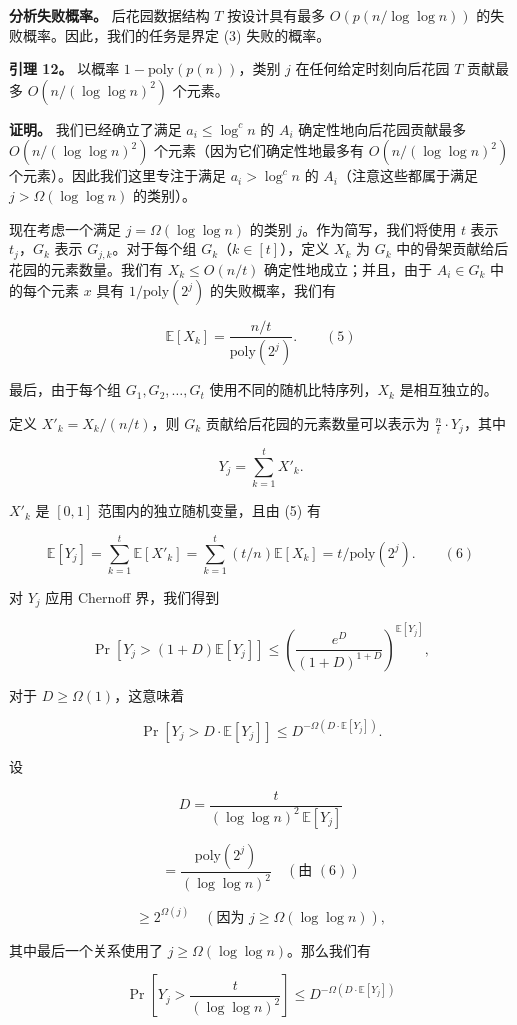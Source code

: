\documentclass[12pt,a4paper]{ctexart}
\theoremstyle{remark}
\begin{document}
\textbf{分析失败概率。} 后花园数据结构 $T$ 按设计具有最多 $O(p(n/\log\log n))$ 的失败概率。因此，我们的任务是界定 (3) 失败的概率。

\textbf{引理 12。} 以概率 $1-\text{poly}(p(n))$，类别 $j$ 在任何给定时刻向后花园 $T$ 贡献最多 $O(n/(\log\log n)^2)$ 个元素。

\textbf{证明。} 我们已经确立了满足 $a_i\leq\log^c n$ 的 $A_i$ 确定性地向后花园贡献最多 $O(n/(\log\log n)^2)$ 个元素（因为它们确定性地最多有 $O(n/(\log\log n)^2)$ 个元素）。因此我们这里专注于满足 $a_i>\log^c n$ 的 $A_i$（注意这些都属于满足 $j>\Omega(\log\log n)$ 的类别）。

现在考虑一个满足 $j=\Omega(\log\log n)$ 的类别 $j$。作为简写，我们将使用 $t$ 表示 $t_j$，$G_k$ 表示 $G_{j,k}$。对于每个组 $G_k$（$k\in[t]$），定义 $X_k$ 为 $G_k$ 中的骨架贡献给后花园的元素数量。我们有 $X_k\leq O(n/t)$ 确定性地成立；并且，由于 $A_i\in G_k$ 中的每个元素 $x$ 具有 $1/\text{poly}(2^j)$ 的失败概率，我们有

$$\mathbb{E}[X_k]=\frac{n/t}{\text{poly}(2^j)}.\qquad(5)$$

最后，由于每个组 $G_1,G_2,\ldots,G_t$ 使用不同的随机比特序列，$X_k$ 是相互独立的。

定义 $X'_k=X_k/(n/t)$，则 $G_k$ 贡献给后花园的元素数量可以表示为 $\frac{n}{t}\cdot Y_j$，其中

$$Y_j=\sum_{k=1}^{t} X'_k.$$

$X'_k$ 是 $[0,1]$ 范围内的独立随机变量，且由 (5) 有

$$\mathbb{E}[Y_j]=\sum_{k=1}^{t}\mathbb{E}[X'_k]=\sum_{k=1}^{t}(t/n)\mathbb{E}[X_k]=t/\text{poly}(2^j).\qquad(6)$$

对 $Y_j$ 应用 Chernoff 界，我们得到

$$\Pr[Y_j>(1+D)\mathbb{E}[Y_j]]\leq\left(\frac{e^D}{(1+D)^{1+D}}\right)^{\mathbb{E}[Y_j]},$$

对于 $D\geq\Omega(1)$，这意味着

$$\Pr[Y_j>D\cdot\mathbb{E}[Y_j]]\leq D^{-\Omega(D\cdot\mathbb{E}[Y_j])}.$$

设

$$D=\frac{t}{(\log\log n)^2\,\mathbb{E}[Y_j]}$$

$$=\frac{\text{poly}(2^j)}{(\log\log n)^2}\quad(\text{由 }(6))$$

$$\geq 2^{\Omega(j)}\quad(\text{因为 }j\geq\Omega(\log\log n)),$$

其中最后一个关系使用了 $j\geq\Omega(\log\log n)$。那么我们有

$$\Pr\left[Y_j>\frac{t}{(\log\log n)^2}\right]\leq D^{-\Omega(D\cdot\mathbb{E}[Y_j])}$$
\end{document}
